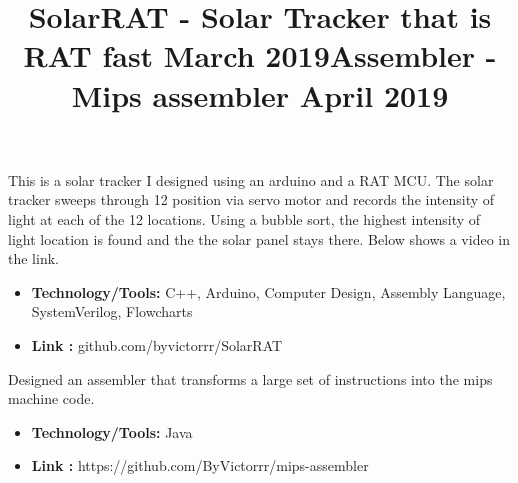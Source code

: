 \documentclass[margin]{res}
\begin{document}
\begin{resume}
{%
\location{}
\title{\textbf{ SolarRAT - Solar Tracker that is RAT fast  \hfill March 2019}}
\begin{position}
 This is a solar tracker I designed using an arduino and a RAT MCU. The solar tracker sweeps through 12 position via servo motor and records the intensity of light at each of the 12 locations. Using a bubble sort, the highest intensity of light location is found and the the solar panel stays there. Below shows a video in the link.
\begin{itemize}
\item \textbf{Technology/Tools:} C++, Arduino, Computer Design, Assembly Language, SystemVerilog, Flowcharts
\end{itemize}
\begin{itemize}
\item \textbf{Link :} github.com/byvictorrr/SolarRAT
\end{itemize}
\end{position}

\location{}
\title{\textbf{Assembler - Mips assembler \hfill April 2019}}
\begin{position}
Designed an assembler that transforms a large set of instructions into the mips machine code.
\begin{itemize}
\item \textbf{Technology/Tools:} Java
\end{itemize}
\begin{itemize}
\item \textbf{Link :} https://github.com/ByVictorrr/mips-assembler
\end{itemize}
\end{position}

}
\end{resume}
\end{document}
